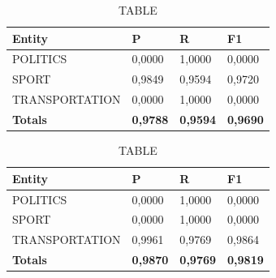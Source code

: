 \documentclass[thesis=M,english]{FITthesis}[2018/05/30]
\begin{document}
	\begin{table}[H]\centering
		\caption{TABLE}
		\label{}
		\begin{tabular}{|l|l|l|l|}
			\hline {\textbf{Entity}} & {\textbf{P}} & {\textbf{R}} & {\textbf{F1}}\\\hline
				POLITICS & 0,0000 & 1,0000 & 0,0000\\
				SPORT & 0,9849 & 0,9594 & 0,9720\\
				TRANSPORTATION & 0,0000 & 1,0000 & 0,0000\\\hline
				\textbf{Totals} & \textbf{0,9788} & \textbf{0,9594} & \textbf{0,9690}\\\hline
		\end{tabular}
	\end{table}	

	\begin{table}[H]\centering
		\caption{TABLE}
		\label{}
		\begin{tabular}{|l|l|l|l|}
			\hline {\textbf{Entity}} & {\textbf{P}} & {\textbf{R}} & {\textbf{F1}}\\\hline
				POLITICS & 0,0000 & 1,0000 & 0,0000\\
				SPORT & 0,0000 & 1,0000 & 0,0000\\
				TRANSPORTATION & 0,9961 & 0,9769 & 0,9864\\\hline
				\textbf{Totals} & \textbf{0,9870} & \textbf{0,9769} & \textbf{0,9819}\\\hline
		\end{tabular}
	\end{table}	
		

\end{document}
